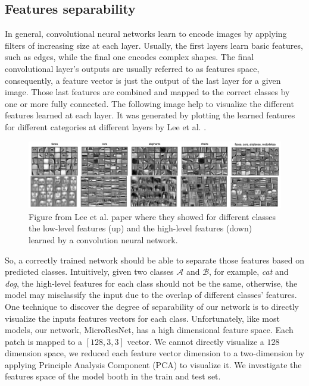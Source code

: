 \documentclass[../document.tex]{subfiles}
\begin{document}
\subsection{Features separability}
In general, convolutional neural networks learn to encode images by applying filters of increasing size at each layer. Usually, the first layers learn basic features, such as edges, while the final one encodes complex shapes. The final convolutional layer's outputs are usually referred to as features space, consequently, a feature vector is just the output of the last layer for a given image. Those last features are combined and mapped to the correct classes by one or more fully connected. The following image help to visualize the different features learned at each layer. It was generated by plotting the learned features for different categories at different layers by 
Lee et al. \cite{deepbelief}. 
\begin{figure} [htbp]
    \centering
    \includegraphics[width=\linewidth]{../img/5/deep_belief.png}
    \caption{Figure from Lee et al. \cite{deepbelief} paper where they showed for different classes the low-level features (up) and the high-level features (down) learned by a convolution neural network.}
\end{figure}
So, a correctly trained network should be able to separate those features based on predicted classes. Intuitively, given two classes $\mathcal{A}$ and $\mathcal{B}$, for example, \emph{cat} and \emph{dog}, the high-level features for each class should not be the same, otherwise, the model may misclassify the input due to the overlap of different classes' features. 
One technique to discover the degree of separability of our network is to directly visualize the inputs features vectors for each class. Unfortunately, like most models, our network, MicroResNet, has a high dimensional feature space. Each patch is mapped to a  $[128, 3, 3 ]$ vector. We cannot directly visualize a $128$ dimension space, we reduced each feature vector dimension to a two-dimension by applying Principle Analysis Component (PCA) \cite{pca} to visualize it. We investigate the features space of the model booth in the train and test set.
\end{document}

